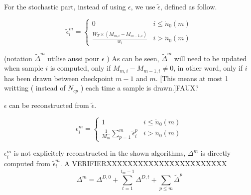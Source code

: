 \documentclass[./thesis.tex]{subfiles}
\begin{document}
For the stochastic part, instead of using $\epsilon$, we use $\tilde \epsilon$, defined as follow.

\begin{equation}
\tilde \epsilon^m_i = 
\begin{cases}
0 & i \leq \dot n_0(m) \\
\frac{W_T \times (M_{m,i}-M_{m-1,i})}{w_i}  & i>\dot n_0(m)
\end{cases}
\end{equation}

(notation  $\tilde \Delta^m$ utilise aussi pour $\epsilon$ )
As can be seen, $\tilde \Delta^m$ will need to be updated when sample $i$ is computed, only if $M_{m,i}-M_{m-1,i} \neq 0$, in other word, only if $i$ has been drawn between checkpoint $m-1$ and $m$. [This means at most 1 writting ( instead of $N_{cp}$ ) each time a sample is drawn.]FAUX? 

$\epsilon$ can be reconstructed from $\tilde \epsilon$.




\begin{equation}
\epsilon^m_i =
\begin{cases}
1 & i \leq \dot n_0(m) \\
\frac{1}{M_m} \sum_{p=1}^{m} {\tilde \epsilon^p_i} & i > \dot n_0(m)
\end{cases}
\end{equation}



$\epsilon^m_i$ is not explicitely reconstructed in the shown algorithms, $\Delta^m$ is directly computed from $\tilde \epsilon^m_i$.
\alert{A VERIFIERXXXXXXXXXXXXXXXXXXXXXXX}
\begin{equation}
\Delta^m=\Delta^{D,0} + \sum_{t=1}^{\dot t_{m}-1} \Delta^{D,t} + \sum_{p \leq m} \tilde \Delta^p
\end{equation}
\end{document}
